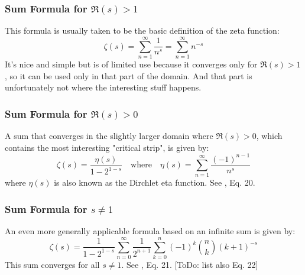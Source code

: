 \documentclass[12pt]{article}
\begin{document}
\subsubsection{Sum Formula for $\Re(s) > 1$}
This formula is usually taken to be the basic definition of the zeta function:
\begin{equation}
\label{Eq:OriginalSum}
\zeta(s) 
= \sum_{n=1}^{\infty} \frac{1}{n^s} 
= \sum_{n=1}^{\infty} n^{-s}	
\end{equation}
It's nice and simple but is of limited use because it converges only for $\Re(s) > 1$, so it can be used only in that part of the domain. And that part is unfortunately not where the interesting stuff happens.

\subsubsection{Sum Formula for $\Re(s) > 0$}
A sum that converges in the slightly larger domain where $\Re(s) > 0$, which contains the most interesting "critical strip", is given by:
\begin{equation}
\label{Eq:AlternatingSum}
\zeta(s) 
= \frac{\eta(s)}{1 - 2^{1-s}} \quad \text{where} \quad
\eta(s)
= \sum_{n=1}^{\infty} \frac{(-1)^{n-1}}{n^s}
\end{equation}
where $\eta(s)$ is also known as the Dirchlet eta function. See \cite{Wolfram}, Eq. 20.

\subsubsection{Sum Formula for $s \neq 1$}
An even more generally applicable formula based on an infinite sum is given by:
\begin{equation}
\label{Eq:BinomialSum}	
\zeta(s) 
= \frac{1}{1 - 2^{1-s}} 
  \sum_{n=0}^{\infty} \frac{1}{2^{n+1}}
  \sum_{k=0}^n (-1)^k \binom{n}{k} (k+1)^{-s}
\end{equation}
This sum converges for all $s \neq 1$. See \cite{Wolfram}, Eq. 21. [ToDo: list also Eq. 22]
\end{document}
